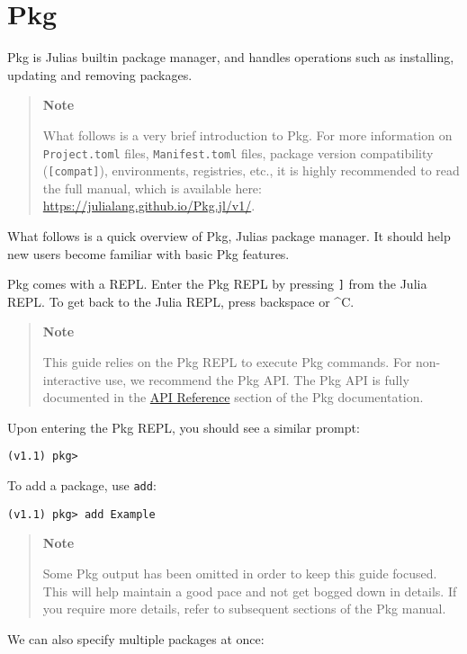 \hypertarget{16222174321033129856}{}


\chapter{Pkg}



Pkg is Julia{\textquotesingle}s builtin package manager, and handles operations such as installing, updating and removing packages.



\begin{quote}
\textbf{Note}

What follows is a very brief introduction to Pkg. For more information on \texttt{Project.toml} files, \texttt{Manifest.toml} files, package version compatibility (\texttt{[compat]}), environments, registries, etc., it is highly recommended to read the full manual, which is available here: \href{https://julialang.github.io/Pkg.jl/v1/}{https://julialang.github.io/Pkg.jl/v1/}.

\end{quote}


What follows is a quick overview of Pkg, Julia{\textquotesingle}s package manager. It should help new users become familiar with basic Pkg features.

Pkg comes with a REPL. Enter the Pkg REPL by pressing \texttt{]} from the Julia REPL. To get back to the Julia REPL, press backspace or {\textasciicircum}C.

\begin{quote}
\textbf{Note}

This guide relies on the Pkg REPL to execute Pkg commands. For non-interactive use, we recommend the Pkg API. The Pkg API is fully documented in the \href{https://julialang.github.io/Pkg.jl/v1/api/}{API Reference} section of the Pkg documentation.

\end{quote}
Upon entering the Pkg REPL, you should see a similar prompt:


\begin{verbatim}
(v1.1) pkg>
\end{verbatim}

To add a package, use \texttt{add}:


\begin{verbatim}
(v1.1) pkg> add Example
\end{verbatim}

\begin{quote}
\textbf{Note}

Some Pkg output has been omitted in order to keep this guide focused. This will help maintain a good pace and not get bogged down in details. If you require more details, refer to subsequent sections of the Pkg manual.

\end{quote}
We can also specify multiple packages at once:


